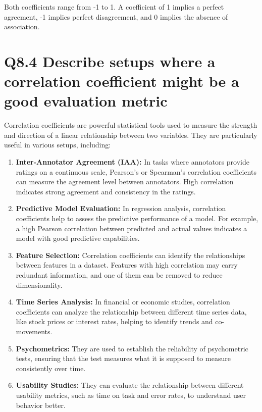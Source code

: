 \documentclass[11pt]{article}
\begin{document}
Both coefficients range from -1 to 1. A coefficient of 1 implies a perfect agreement, -1 implies perfect disagreement, and 0 implies the absence of association.

\section{Q8.4 Describe setups where a correlation coefficient might be a good evaluation metric}

Correlation coefficients are powerful statistical tools used to measure the strength and direction of a linear relationship between two variables. They are particularly useful in various setups, including:

\begin{enumerate}
  \item \textbf{Inter-Annotator Agreement (IAA):} In tasks where annotators provide ratings on a continuous scale, Pearson's or Spearman's correlation coefficients can measure the agreement level between annotators. High correlation indicates strong agreement and consistency in the ratings.

  \item \textbf{Predictive Model Evaluation:} In regression analysis, correlation coefficients help to assess the predictive performance of a model. For example, a high Pearson correlation between predicted and actual values indicates a model with good predictive capabilities.

  \item \textbf{Feature Selection:} Correlation coefficients can identify the relationships between features in a dataset. Features with high correlation may carry redundant information, and one of them can be removed to reduce dimensionality.

  \item \textbf{Time Series Analysis:} In financial or economic studies, correlation coefficients can analyze the relationship between different time series data, like stock prices or interest rates, helping to identify trends and co-movements.

  \item \textbf{Psychometrics:} They are used to establish the reliability of psychometric tests, ensuring that the test measures what it is supposed to measure consistently over time.

  \item \textbf{Usability Studies:} They can evaluate the relationship between different usability metrics, such as time on task and error rates, to understand user behavior better.
\end{enumerate}
\end{document}
